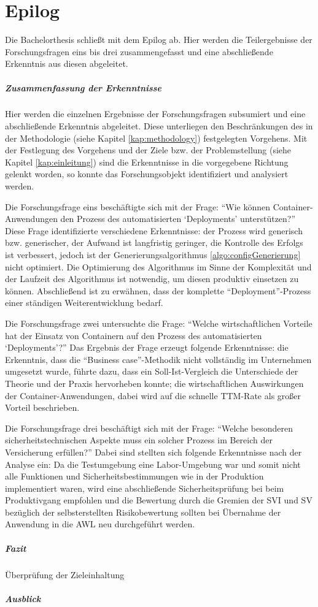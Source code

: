 \chapter{Epilog} \label{kritischeBetrachtung}
Die Bachelorthesis schließt mit dem Epilog ab. Hier werden die Teilergebnisse der Forschungsfragen eins bis drei zusammengefasst und eine abschließende Erkenntnis aus diesen abgeleitet. 
\paragraph{Zusammenfassung der Erkenntnisse}
Hier werden die einzelnen Ergebnisse der Forschungsfragen subsumiert und eine abschließende Erkenntnis abgeleitet. Diese unterliegen den Beschränkungen des in der Methodologie (siehe Kapitel \vref{kap:methodology}) festgelegten Vorgehens. Mit der Festlegung des Vorgehens und der Ziele bzw. der Problemstellung (siehe Kapitel \vref{kap:einleitung}) sind die Erkenntnisse in die vorgegebene Richtung gelenkt worden, so konnte das Forschungsobjekt identifiziert und analysiert werden.
\par
Die Forschungsfrage eins beschäftigte sich mit der Frage: \enquote{Wie können Container-Anwendungen den Prozess des automatisierten \enquote{Deployments} unterstützen?} Diese Frage identifizierte verschiedene Erkenntnisse: der Prozess wird generisch bzw. generischer, der Aufwand ist langfristig geringer, die Kontrolle des Erfolgs ist verbessert, jedoch ist der Generierungsalgorithmus \vref{algo:configGenerierung} nicht optimiert. Die Optimierung des Algorithmus im Sinne der Komplexität und der Laufzeit des Algorithmus ist notwendig, um diesen produktiv einsetzen zu können. Abschließend ist zu erwähnen, dass der komplette \enquote{Deployment}-Prozess einer ständigen Weiterentwicklung bedarf.
\par
Die Forschungsfrage zwei untersuchte die Frage: \enquote{Welche wirtschaftlichen Vorteile hat der Einsatz von Containern auf den Prozess des automatisierten \enquote{Deployments}?} Das Ergebnis der Frage erzeugt folgende Erkenntnisse: die Erkenntnis, dass die \enquote{Business case}-Methodik nicht vollständig im Unternehmen umgesetzt wurde, führte dazu, dass ein Soll-Ist-Vergleich die Unterschiede der Theorie und der Praxis hervorheben konnte; die wirtschaftlichen Auswirkungen der Container-Anwendungen, dabei wird auf die schnelle \ac{TTM}-Rate als großer Vorteil beschrieben.
\par
Die Forschungsfrage drei beschäftigt sich mit der Frage: \enquote{Welche besonderen sicherheitstechnischen Aspekte muss ein solcher Prozess im Bereich der Versicherung erfüllen?} Dabei sind stellten sich folgende Erkenntnisse nach der Analyse ein: Da die Testumgebung eine Labor-Umgebung war und somit nicht alle Funktionen und Sicherheitsbestimmungen wie in der Produktion implementiert waren, wird eine abschließende Sicherheitsprüfung bei beim Produktivgang empfohlen und die Bewertung durch die Gremien der \ac{SVI} und \ac{SV} bezüglich der selbsterstellten Risikobewertung sollten bei Übernahme der Anwendung in die \ac{AWL} neu durchgeführt werden.

\paragraph{Fazit}
Überprüfung der Zieleinhaltung
\paragraph{Ausblick}